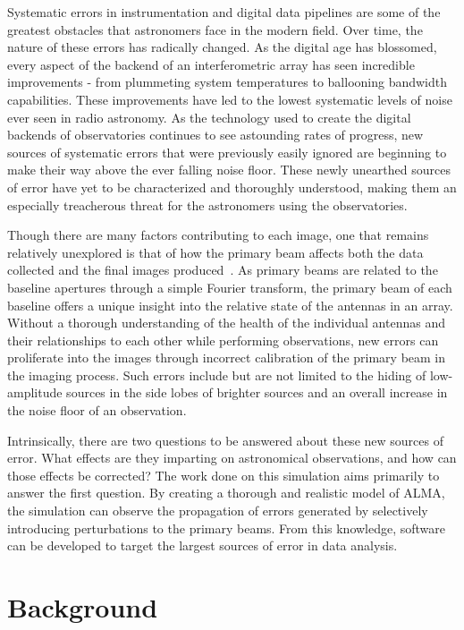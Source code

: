\documentclass[11pt]{article}
\begin{document}
Systematic errors in instrumentation and digital data pipelines are some of the 
greatest obstacles that astronomers face in the modern field. Over time, the 
nature of these errors has radically changed. As the digital age has blossomed, 
every aspect of the backend of an interferometric array has seen incredible 
improvements - from plummeting system temperatures to ballooning bandwidth 
capabilities. These improvements have led to the lowest systematic levels of 
noise ever seen in radio astronomy.  As the technology used to create the 
digital backends of observatories continues to see astounding rates of 
progress, new sources of systematic errors that were previously easily ignored 
are beginning to make their way above the ever falling noise floor. These newly 
unearthed sources of error have yet to be characterized and thoroughly 
understood, making them an especially treacherous threat for the astronomers 
using the observatories.

Though there are many factors contributing to each image, one that remains 
relatively unexplored is that of how the primary beam affects both the data 
collected and the final images produced~\cite{corder}. As primary beams are 
related to the baseline apertures through a simple Fourier transform, the 
primary beam of each baseline offers a unique insight into the relative state 
of the antennas in an array. Without a thorough understanding of the health of 
the individual antennas and their relationships to each other while performing 
observations, new errors can proliferate into the images through incorrect 
calibration of the primary beam in the imaging process. Such errors include but 
are not limited to the hiding of low-amplitude sources in the side lobes of 
brighter sources and an overall increase in the noise floor of an observation.

Intrinsically, there are two questions to be answered about these new sources 
of error. What effects are they imparting on astronomical observations, and how 
can those effects be corrected? The work done on this simulation aims primarily 
to answer the first question. By creating a thorough and realistic model of 
ALMA, the simulation can observe the propagation of errors generated by 
selectively introducing perturbations to the primary beams. From this 
knowledge, software can be developed to target the largest sources of error in 
data analysis.

\section{Background}
\end{document}

